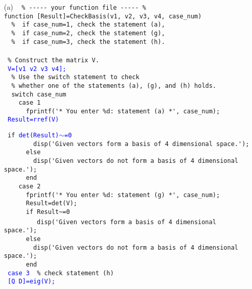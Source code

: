 \begin{sol}

\vspace{1mm}
\verb""
\begin{enumerate}
\item[(a)]
\verb" "
\verb"% ----- your function file ----- %"\\
\verb"function [Result]=CheckBasis(v1, v2, v3, v4, case_num)"\\
\verb"  %  if case_num=1, check the statement (a),"\\
\verb"  %  if case_num=2, check the statement (g),"\\
\verb"  %  if case_num=3, check the statement (h)."\\
\\
\verb" % Construct the matrix V."\\
  \textcolor{blue}{\texttt{  V=[v1 v2 v3 v4];}}\\

\verb"  % Use the switch statement to check" \\
\verb"  % whether one of the statements (a), (g), and (h) holds."\\
\verb"  switch case_num"\\
\verb"    case 1"  \\
\verb"      fprintf('* You enter %d: statement (a) *', case_num);"\\
\textcolor{blue}{\texttt{ \hspace{8mm}         Result=rref(V)}}

\hspace{8mm}      \texttt{ if \textcolor{blue}{det(Result)$\sim$=0}}\\
\verb"        disp('Given vectors form a basis of 4 dimensional space.');"\\
\verb"      else"\\
\verb"        disp('Given vectors do not form a basis of 4 dimensional space.');"\\
\verb"      end"\\
\verb"    case 2"\\
\verb"      fprintf('* You enter %d: statement (g) *', case_num);"\\
\verb"      Result=det(V);"\\
\verb"      if Result~=0"\\\
\verb"        disp('Given vectors form a basis of 4 dimensional space.');"\\
\verb"      else"\\
\verb"        disp('Given vectors do not form a basis of 4 dimensional space.');"\\
\verb"      end"\\
\textcolor{blue}{\texttt{  \hspace{4mm}  case 3}}\verb"  % check statement (h)"\\
\textcolor{blue}{\texttt{  \hspace{8mm}      [Q D]=eig(V);}}


\end{enumerate}
\end{sol}
